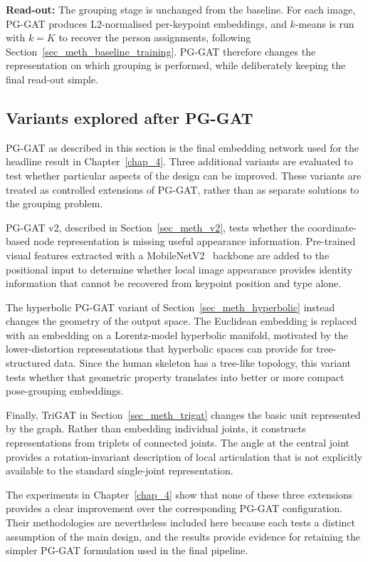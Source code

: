 \textbf{Read-out:}
The grouping stage is unchanged from the baseline.
For each image, PG-GAT produces L2-normalised per-keypoint embeddings,
and $k$-means is run with $k=K$ to recover the person assignments,
following Section~\ref{sec_meth_baseline_training}.
PG-GAT therefore changes the representation on which grouping is performed,
while deliberately keeping the final read-out simple.

\subsection{Variants explored after PG-GAT}
\label{sec_meth_pggat_variants}

PG-GAT as described in this section is the final embedding network used
for the headline result in Chapter~\ref{chap_4}.
Three additional variants are evaluated to test whether particular
aspects of the design can be improved.
These variants are treated as controlled extensions of PG-GAT,
rather than as separate solutions to the grouping problem.

PG-GAT v2, described in Section~\ref{sec_meth_v2},
tests whether the coordinate-based node representation
is missing useful appearance information.
Pre-trained visual features extracted with a
MobileNetV2~\cite{sandler2018mobilenetv2} backbone are added to the
positional input to determine whether local image appearance provides
identity information that cannot be recovered from keypoint position
and type alone.

The hyperbolic PG-GAT variant of
Section~\ref{sec_meth_hyperbolic} instead changes the geometry of the
output space.
The Euclidean embedding is replaced with an embedding on a
Lorentz-model hyperbolic manifold,
motivated by the lower-distortion representations
that hyperbolic spaces can provide for tree-structured data.
Since the human skeleton has a tree-like topology,
this variant tests whether that geometric property translates
into better or more compact pose-grouping embeddings.

Finally, TriGAT in Section~\ref{sec_meth_trigat}
changes the basic unit represented by the graph.
Rather than embedding individual joints,
it constructs representations from triplets of connected joints.
The angle at the central joint provides a rotation-invariant description
of local articulation that is not explicitly available
to the standard single-joint representation.

The experiments in Chapter~\ref{chap_4} show that none of these three extensions
provides a clear improvement over the corresponding PG-GAT configuration.
Their methodologies are nevertheless included here because each tests
a distinct assumption of the main design,
and the results provide evidence for retaining the simpler PG-GAT
formulation used in the final pipeline.